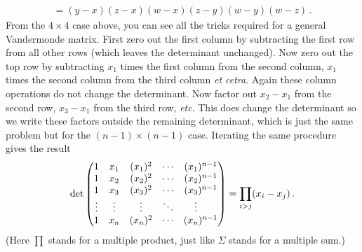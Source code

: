 \begin{enumerate}
\begin{gather*}
\\
=(y-x)(z-x)(w-x) (z-y)(w-y)(w-z)\, .
\end{gather*}
From the $4\times 4$ case above, you can see all the tricks required for a general Vandermonde matrix.
First zero out the first column by subtracting the first row from all other rows (which leaves the determinant unchanged). Now zero out the top row by subtracting $x_1$ times the first column from the second column,
$x_1$ times the second column from the third column {\itshape et cetra}. Again these column operations do not
change the determinant. Now factor out $x_2-x_1$ from the second row, $x_3-x_1$ from the third row, {\itshape etc}. This does change the determinant so we write these factors outside the remaining determinant, which is just the same problem but for the $(n-1)\times(n-1)$ case. Iterating the same procedure gives the result
\[
\det \begin{pmatrix}1 & x_1 & (x_1)^2 & \cdots &(x_1)^{n-1}\\ 
1 & x_2& (x_2)^2 & \cdots &  (x_2)^{n-1}\\ 
1 & x_3& (x_3)^2 & \cdots &  (x_3)^{n-1}\\ 
\mc\vdots &\mc\vdots &\mc\vdots &\ddots & \mc\vdots\ \ \  \\ 
1 & x_n& (x_n)^2 & \cdots &  (x_n)^{n-1}\end{pmatrix}
=\prod_{i>j}(x_i-x_j)\, .
\]
(Here $\prod$ stands for a multiple product, just like $\Sigma$ stands for a multiple sum.)


\end{enumerate}
